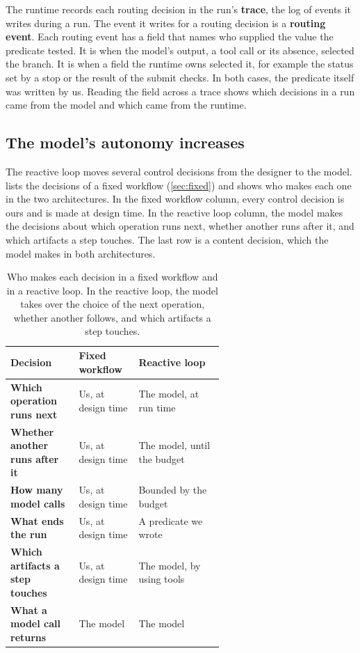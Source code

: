 The runtime records each routing decision in the run's \textbf{trace}, the log of events it writes
during a run. The event it writes for a routing decision is a \textbf{routing event}. Each routing
event has a  field that names who supplied the value the predicate tested. It is  when the model's output, a tool call or its absence,
selected the branch. It is  when a field the runtime owns selected it, for
example the status set by a stop or the result of the submit checks. In both cases, the predicate
itself was written by us. Reading the  field across a trace shows which decisions in a
run came from the model and which came from the runtime.

\subsection{The model's autonomy increases}
\label{sec:reactive-autonomy}

The reactive loop moves several control decisions from the designer to the model.
 lists the decisions of a fixed workflow (\cref{sec:fixed}) and shows
who makes each one in the two architectures. In the fixed workflow column, every control decision
is ours and is made at design time. In the reactive loop column, the model makes the decisions about
which operation runs next, whether another runs after it, and which artifacts a step touches. The
last row is a content decision, which the model makes in both architectures.

\begin{table}[htbp]
  \caption{Who makes each decision in a fixed workflow and in a reactive loop. In the reactive loop,
  the model takes over the choice of the next operation, whether another follows, and which
  artifacts a step touches.}
  \label{tab:reactive-autonomy}
  \begin{adjustbox}{width=\linewidth}\begin{tabularx}{\linewidth}{L{0.32\linewidth}L{0.29\linewidth}X}
    \toprule
    \textbf{Decision} & \textbf{Fixed workflow} & \textbf{Reactive loop} \\
    \midrule
    \textbf{Which operation runs next} & Us, at design time & The model, at run time \\
    \textbf{Whether another runs after it} & Us, at design time & The model, until the budget \\
    \textbf{How many model calls} & Us, at design time & Bounded by the budget \\
    \textbf{What ends the run} & Us, at design time & A predicate we wrote \\
    \textbf{Which artifacts a step touches} & Us, at design time & The model, by using tools \\
    \textbf{What a model call returns} & The model & The model \\
    \bottomrule
  \end{tabularx}\end{adjustbox}
\end{table}

